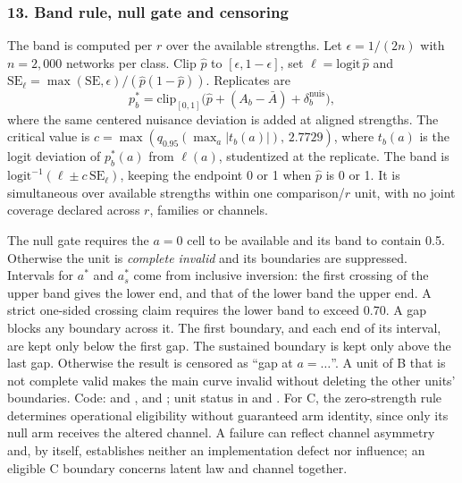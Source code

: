 \subsubsection*{13. Band rule, null gate and censoring}
The band is computed per $r$ over the available strengths. Let $\epsilon=1/(2n)$ with $n=2{,}000$ networks per class. Clip $\hat p$ to $[\epsilon,1-\epsilon]$, set $\ell=\mathrm{logit}\,\hat p$ and $\mathrm{SE}_\ell=\max(\mathrm{SE},\epsilon)/(\hat p(1-\hat p))$. Replicates are
\begin{equation*}
p^*_b=\mathrm{clip}_{[0,1]}\bigl(\hat p+(A_b-\bar A)+\delta^{\mathrm{nuis}}_b\bigr),
\end{equation*}
where the same centered nuisance deviation is added at aligned strengths. The critical value is $c=\max(q_{0.95}(\max_a|t_b(a)|),\,2.7729)$, where $t_b(a)$ is the logit deviation of $p^*_b(a)$ from $\ell(a)$, studentized at the replicate. The band is $\mathrm{logit}^{-1}(\ell\pm c\,\mathrm{SE}_\ell)$, keeping the endpoint 0 or 1 when $\hat p$ is 0 or 1. It is simultaneous over available strengths within one comparison/$r$ unit, with no joint coverage declared across $r$, families or channels.

The null gate requires the $a=0$ cell to be available and its band to contain 0.5. Otherwise the unit is \emph{complete invalid} and its boundaries are suppressed. Intervals for $a^*$ and $a^*_s$ come from inclusive inversion: the first crossing of the upper band gives the lower end, and that of the lower band the upper end. A strict one-sided crossing claim requires the lower band to exceed 0.70. A gap blocks any boundary across it. The first boundary, and each end of its interval, are kept only below the first gap. The sustained boundary is kept only above the last gap. Otherwise the result is censored as ``gap at $a=\ldots$''. A unit of B that is not complete valid makes the main curve invalid without deleting the other units' boundaries. Code:  and , and ; unit status in  and .
For C, the zero-strength rule determines operational eligibility without guaranteed arm identity, since only its null arm receives the altered channel. A failure can reflect channel asymmetry and, by itself, establishes neither an implementation defect nor influence; an eligible C boundary concerns latent law and channel together. %

